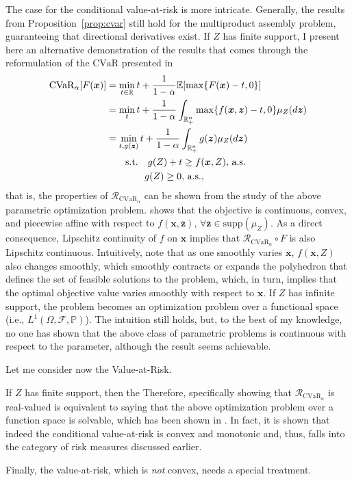 \documentclass[12pt]{article}
\begin{document}
The case for the conditional value-at-risk is more intricate.
Generally, the results from Proposition~\ref{prop:cvar} still hold for the multiproduct assembly problem, guaranteeing that directional derivatives exist.
If $Z$ has finite support, I present here an alternative demonstration of the results that comes through the reformulation of the $\text{CVaR}$ presented in \citet[Chapter~2.9]{birgeIntroductionStochasticProgramming2011}
\begin{align*}
    \text{CVaR}_\alpha[F(\bm{x})] &= \min_{t\in \mathbb{R}} t + \frac{1}{1-\alpha} \mathbb{E}[\max\{F(\bm{x})-t,0\}] \\
    &= \min_{t} t + \frac{1}{1-\alpha} \int_{\mathbb{R}^{n}_+} \max\{f(\bm{x},\bm{z})-t,0\} \mu_Z(d\bm{z}) \\
    &= \min_{t, g(\bm{z})} t + \frac{1}{1-\alpha} \int_{\mathbb{R}^{n}_+} g(\bm{z}) \mu_Z(d\bm{z}) \\
    &\quad\quad \text{s.t.} \quad g(Z) + t \ge f(\bm{x},Z),\, \text{a.s.} \\
    &\quad\quad \quad \quad g(Z) \ge 0,\, \text{a.s.}
,\end{align*}
that is, the properties of $\mathcal{R}_{\text{CVaR}_\alpha}$ can be shown from the study of the above parametric optimization problem.
\citep[Theorem~2.1]{pistikopoulosMultiparametricOptimizationControl2021} shows that the objective is continuous, convex, and piecewise affine with respect to $f(\bm{x},\overline{\bm{z}}),\,\forall \overline{\bm{z}}\in \text{supp}(\mu_Z)$.
As a direct consequence, Lipschitz continuity of $f$ on $\bm{x}$ implies that $\mathcal{R}_{\text{CVaR}_\alpha} \circ F$ is also Lipschitz continuous.
Intuitively, note that as one smoothly varies $\bm{x}$, $f(\bm{x},Z)$ also changes smoothly, which smoothly contracts or expands the polyhedron that defines the set of feasible solutions to the problem, which, in turn, implies that the optimal objective value varies smoothly with respect to $\bm{x}$.
If $Z$ has infinite support, the problem becomes an optimization problem over a functional space (i.e., $L^{1}(\Omega,\mathcal{F},\mathbb{P})$).
The intuition still holds, but, to the best of my knowledge, no one has shown that the above class of parametric problems is continuous with respect to the parameter, although the result seems achievable.

Let me consider now the Value-at-Risk.

If $Z$ has finite support, then the 
Therefore, specifically showing that $\mathcal{R}_{\text{CVaR}_\alpha}$ is real-valued is equivalent to saying that the above optimization problem over a function space is solvable, which has been shown in \citet[Chapter~6.2.4]{shapiroLecturesStochasticProgramming2009}.
In fact, it is shown that indeed the conditional value-at-risk is convex and monotonic and, thus, falls into the category of risk measures discussed earlier.

Finally, the value-at-risk, which is \emph{not} convex, needs a special treatment.






% 
\printbibliography
    
\end{document}
